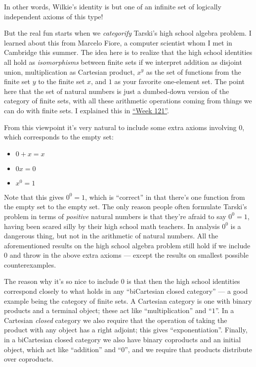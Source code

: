 \documentclass{article}
\def\tightlist{}
\begin{document}
In other words, Wilkie's identity is but one of an infinite set of
logically independent axioms of this type!

But the real fun starts when we \emph{categorify} Tarski's high school
algebra problem. I learned about this from Marcelo Fiore, a computer
scientist whom I met in Cambridge this summer. The idea here is to
realize that the high school identities all hold as \emph{isomorphisms}
between finite sets if we interpret addition as disjoint union,
multiplication as Cartesian product, \(x^y\) as the set of functions
from the finite set \(y\) to the finite set \(x\), and \(1\) as your
favorite one-element set. The point here that the set of natural numbers
is just a dumbed-down version of the category of finite sets, with all
these arithmetic operations coming from things we can do with finite
sets. I explained this in \protect\hyperlink{week121}{``Week 121''}.

From this viewpoint it's very natural to include some extra axioms
involving \(0\), which corresponds to the empty set:

\begin{itemize}
\tightlist
\item
  \(0 + x = x\)
\item
  \(0x = 0\)
\item
  \(x^0 = 1\)
\end{itemize}

Note that this gives \(0^0 = 1\), which is ``correct'' in that there's
one function from the empty set to the empty set. The only reason people
often formulate Tarski's problem in terms of \emph{positive} natural
numbers is that they're afraid to say \(0^0 = 1\), having been scared
silly by their high school math teachers. In analysis \(0^0\) is a
dangerous thing, but not in the arithmetic of natural numbers. All the
aforementioned results on the high school algebra problem still hold if
we include 0 and throw in the above extra axioms --- except the results
on smallest possible counterexamples.

The reason why it's so nice to include \(0\) is that then the high
school identities correspond closely to what holds in any ``biCartesian
closed category'' --- a good example being the category of finite sets.
A Cartesian category is one with binary products and a terminal object;
these act like ``multiplication'' and ``\(1\)''. In a Cartesian
\emph{closed} category we also require that the operation of taking the
product with any object has a right adjoint; this gives
``exponentiation''. Finally, in a biCartesian closed category we also
have binary coproducts and an initial object, which act like
``addition'' and ``\(0\)'', and we require that products distribute over
coproducts.
\end{document}
